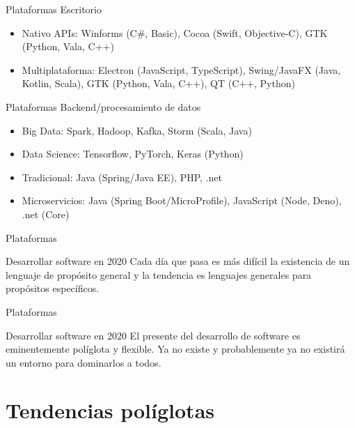 \documentclass[aspectratio=169]{beamer}
\begin{document}
\begin{frame}{Plataformas}
    Escritorio
	\begin{itemize}
	\item Nativo APIs: Winforms (C\#, Basic), Cocoa (Swift, Objective-C), GTK (Python, Vala, C++)
    \item Multiplataforma: Electron (JavaScript, TypeScript), Swing/JavaFX (Java, Kotlin, Scala), GTK (Python, Vala, C++), QT (C++, Python)
	\end{itemize}
\end{frame}



\begin{frame}{Plataformas}
    Backend/procesamiento de datos
	\begin{itemize}
	\item Big Data: Spark, Hadoop, Kafka, Storm (Scala, Java)
    \item Data Science: Tensorflow, PyTorch, Keras (Python)
    \item Tradicional: Java (Spring/Java EE), PHP, .net
    \item Microservicios: Java (Spring Boot/MicroProfile), JavaScript (Node, Deno), .net (Core)

	\end{itemize}
\end{frame}

\begin{frame}{Plataformas}

	\begin{alertblock}{Desarrollar software en 2020}
    Cada día que pasa es más difícil la existencia de un lenguaje de propósito general y la tendencia es lenguajes generales para propósitos específicos.
	\end{alertblock}
\end{frame}

\begin{frame}{Plataformas}

	\begin{alertblock}{Desarrollar software en 2020}
    El presente del desarrollo de software es eminentemente políglota y flexible. Ya no existe y probablemente ya no existirá un entorno para dominarlos a todos.
	\end{alertblock}
\end{frame}

\section{Tendencias políglotas}
\end{document}
